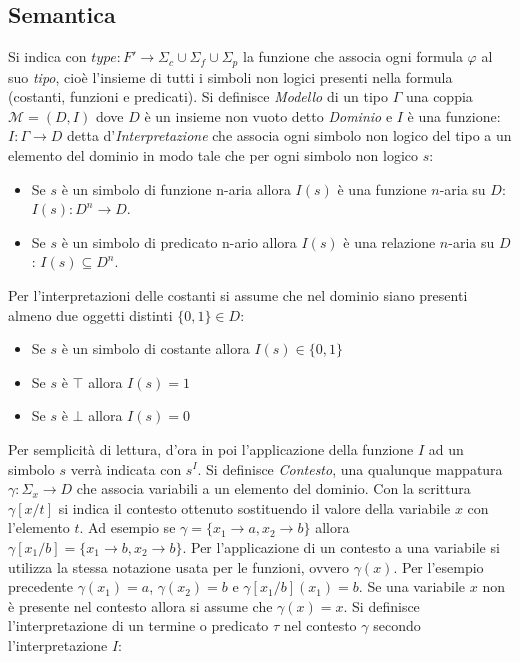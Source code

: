 \documentclass[./main.tex]{subfiles}
\begin{document}


\subsection{Semantica}
Si indica con $type : F' \rightarrow \Sigma_c \cup \Sigma_f \cup \Sigma_p$ la funzione che associa ogni formula $\varphi$ al suo \textit{tipo}, 
cioè l'insieme di tutti i simboli non logici presenti nella formula (costanti, funzioni e predicati).
Si definisce \textit{Modello} di un tipo $\Gamma$ una coppia $\mathcal{M} = (D, I)$ dove $D$ è un insieme non vuoto detto \textit{Dominio} e $I$ è una funzione: 
$I: \Gamma \rightarrow D$ detta d'\textit{Interpretazione} che associa ogni simbolo non logico del tipo a un elemento del dominio in modo tale che per ogni simbolo non logico $s$:

\begin{itemize}
  \item Se $s$ è un simbolo di funzione n-aria allora $I(s)$ è una funzione $n$-aria su $D$: $I(s): D^n \rightarrow D$.
  \item Se $s$ è un simbolo di predicato n-ario allora $I(s)$ è una relazione $n$-aria su $D$: $I(s) \subseteq D^n$.
\end{itemize}

Per l'interpretazioni delle costanti si assume che nel dominio siano presenti almeno due oggetti distinti $\{0, 1\} \in D$:
\begin{itemize}
  \item Se $s$ è un simbolo di costante allora $I(s) \in \{0, 1\}$
  \item Se $s$ è $\top$ allora $I(s) = 1$
  \item Se $s$ è $\bot$ allora $I(s) = 0$
\end{itemize}

Per semplicità di lettura, d'ora in poi l'applicazione della funzione $I$ ad un simbolo $s$ verrà indicata con $s^I$.
Si definisce \textit{Contesto}, una qualunque mappatura $\gamma : \Sigma_x \rightarrow D$ che associa variabili a un elemento del dominio.
Con la scrittura $\gamma[x/t]$ si indica il contesto ottenuto sostituendo il valore della variabile $x$ con l'elemento $t$.
Ad esempio se $\gamma = \{x_1 \rightarrow a, x_2 \rightarrow b\}$ allora $\gamma[x_1/b] = \{x_1 \rightarrow b, x_2 \rightarrow b\}$.
Per l'applicazione di un contesto a una variabile si utilizza la stessa notazione usata per le funzioni, ovvero $\gamma(x)$.
Per l'esempio precedente $\gamma(x_1) = a$, $\gamma(x_2) = b$ e $\gamma[x_1/b](x_1) = b$.
Se una variabile $x$ non è presente nel contesto allora si assume che $\gamma(x) = x$.
Si definisce l'interpretazione di un termine o predicato $\tau$ nel contesto $\gamma$ secondo l'interpretazione $I$:
\end{document}
